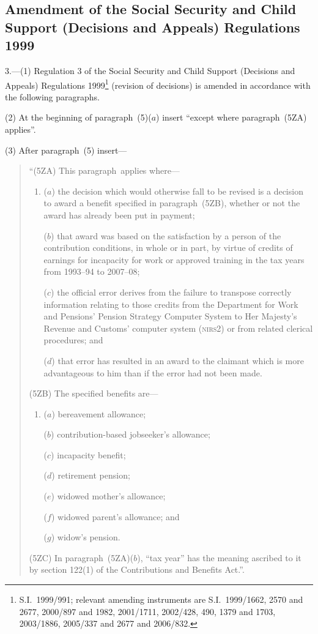 \documentclass[12pt,a4paper]{article}
\begin{document}
\subsection[3. Amendment of the Social Security and Child Support (Decisions and Appeals) Regulations 1999]{Amendment of the Social Security and Child Support (Decisions and Appeals) Regulations 1999}

3.---(1)  Regulation 3 of the Social Security and Child Support (Decisions and Appeals) Regulations 1999\footnote{S.I.~1999/991; relevant amending instruments are S.I.~1999/1662, 2570 and 2677, 2000/897 and 1982, 2001/1711, 2002/428, 490, 1379 and 1703, 2003/1886, 2005/337 and 2677 and 2006/832.} (revision of decisions) is amended in accordance with the following paragraphs.

(2) At the beginning of paragraph~(5)($a$)  insert “except where paragraph~(5ZA) applies”.

(3) After paragraph~(5) insert—
\begin{quotation}
“(5ZA) This paragraph~applies where—
\begin{enumerate}\item[]
($a$) the decision which would otherwise fall to be revised is a decision to award a benefit specified in paragraph~(5ZB), whether or not the award has already been put in payment;

($b$) that award was based on the satisfaction by a person of the contribution conditions, in whole or in part, by virtue of credits of earnings for incapacity for work or approved training in the tax years from 1993--94 to 2007--08;

($c$) the official error derives from the failure to transpose correctly information relating to those credits from the Department for Work and Pensions’ Pension Strategy Computer System to Her Majesty’s Revenue and Customs’ computer system (\textsc{\lowercase{NIRS2}}) or from related clerical procedures; and

($d$) that error has resulted in an award to the claimant which is more advantageous to him than if the error had not been made.
\end{enumerate}

(5ZB) The specified benefits are—
\begin{enumerate}\item[]
($a$) bereavement allowance;

($b$) contribution-based jobseeker’s allowance;

($c$) incapacity benefit;

($d$) retirement pension;

($e$) widowed mother’s allowance;

($f$) widowed parent’s allowance; and

($g$) widow’s pension.
\end{enumerate}

(5ZC) In paragraph~(5ZA)($b$), “tax year” has the meaning ascribed to it by section 122(1) of the Contributions and Benefits Act.”.
\end{quotation}
\end{document}
